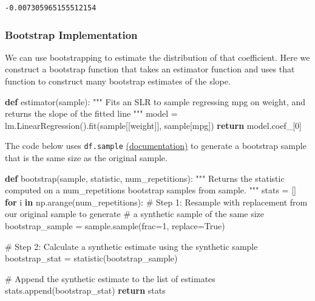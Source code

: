 \documentclass[
  letterpaper,
  DIV=11,
  numbers=noendperiod]{scrreprt}
\newenvironment{Shaded}{\begin{snugshade}}{\end{snugshade}}
\newcommand{\CommentTok}[1]{\textcolor[rgb]{0.37,0.37,0.37}{#1}}
\newcommand{\ControlFlowTok}[1]{\textcolor[rgb]{0.00,0.23,0.31}{\textbf{#1}}}
\newcommand{\DecValTok}[1]{\textcolor[rgb]{0.68,0.00,0.00}{#1}}
\newcommand{\KeywordTok}[1]{\textcolor[rgb]{0.00,0.23,0.31}{\textbf{#1}}}
\newcommand{\NormalTok}[1]{\textcolor[rgb]{0.00,0.23,0.31}{#1}}
\newcommand{\OperatorTok}[1]{\textcolor[rgb]{0.37,0.37,0.37}{#1}}
\newcommand{\StringTok}[1]{\textcolor[rgb]{0.13,0.47,0.30}{#1}}
\newcommand{\VariableTok}[1]{\textcolor[rgb]{0.07,0.07,0.07}{#1}}
\begin{document}
\begin{verbatim}
-0.007305965155512154
\end{verbatim}

\subsubsection{Bootstrap Implementation}\label{bootstrap-implementation}

We can use bootstrapping to estimate the distribution of that
coefficient. Here we construct a bootstrap function that takes an
estimator function and uses that function to construct many bootstrap
estimates of the slope.

\begin{Shaded}
\begin{Highlighting}[]
\KeywordTok{def}\NormalTok{ estimator(sample):}
    \CommentTok{"""}
\CommentTok{    Fits an SLR to \textasciigrave{}sample\textasciigrave{} regressing mpg on weight, }
\CommentTok{    and returns the slope of the fitted line}
\CommentTok{    """}
\NormalTok{    model }\OperatorTok{=}\NormalTok{ lm.LinearRegression().fit(sample[[}\StringTok{\textquotesingle{}weight\textquotesingle{}}\NormalTok{]], sample[}\StringTok{\textquotesingle{}mpg\textquotesingle{}}\NormalTok{])}
    \ControlFlowTok{return}\NormalTok{ model.coef\_[}\DecValTok{0}\NormalTok{]}
\end{Highlighting}
\end{Shaded}

The code below uses \texttt{df.sample}
\href{https://pandas.pydata.org/pandas-docs/stable/reference/api/pandas.DataFrame.sample.html}{(documentation)}
to generate a bootstrap sample that is the same size as the original
sample.

\begin{Shaded}
\begin{Highlighting}[]
\KeywordTok{def}\NormalTok{ bootstrap(sample, statistic, num\_repetitions):}
    \CommentTok{"""}
\CommentTok{    Returns the statistic computed on a num\_repetitions  }
\CommentTok{    bootstrap samples from sample.}
\CommentTok{    """}
\NormalTok{    stats }\OperatorTok{=}\NormalTok{ []}
    \ControlFlowTok{for}\NormalTok{ i }\KeywordTok{in}\NormalTok{ np.arange(num\_repetitions):}
        \CommentTok{\# Step 1: Resample with replacement from our original sample to generate}
        \CommentTok{\# a synthetic sample of the same size}
\NormalTok{        bootstrap\_sample }\OperatorTok{=}\NormalTok{ sample.sample(frac}\OperatorTok{=}\DecValTok{1}\NormalTok{, replace}\OperatorTok{=}\VariableTok{True}\NormalTok{)}
        
        \CommentTok{\# Step 2: Calculate a synthetic estimate using the synthetic sample}
\NormalTok{        bootstrap\_stat }\OperatorTok{=}\NormalTok{ statistic(bootstrap\_sample)}
        
        \CommentTok{\# Append the synthetic estimate to the list of estimates}
\NormalTok{        stats.append(bootstrap\_stat)}
    \ControlFlowTok{return}\NormalTok{ stats   }
\end{Highlighting}
\end{Shaded}
\end{document}
